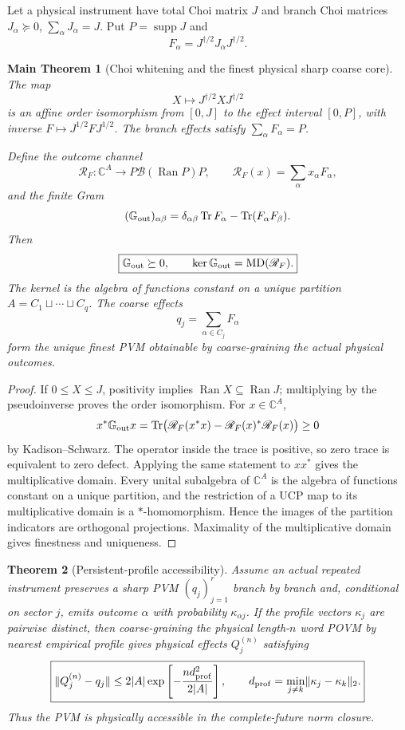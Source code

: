 \documentclass[11pt,oneside,openany]{book}
\numberwithin{equation}{chapter}
\newtheorem{theorem}{Theorem}[chapter]
\newtheorem{maintheorem}[theorem]{Main Theorem}
\theoremstyle{definition}
\theoremstyle{remark}
\newcommand{\C}{\mathbb C}
\newcommand{\Tr}{\operatorname{Tr}}
\newcommand{\supp}{\operatorname{supp}}
\newcommand{\Ran}{\operatorname{Ran}}
\newcommand{\norm}[1]{\lVert #1\rVert}
\begin{document}
Let a physical instrument have total Choi matrix \(J\) and branch Choi
matrices \(J_\alpha\succeq0\), \(\sum_\alpha J_\alpha=J\).  Put
\(P=\supp J\) and
\[
 F_\alpha=J^{\dagger/2}J_\alpha J^{\dagger/2}.
\]

\begin{maintheorem}[Choi whitening and the finest physical sharp coarse core]
\label{thm:v6-sharp-core}
The map
\[
 X\longmapsto J^{\dagger/2}XJ^{\dagger/2}
\]
is an affine order isomorphism from \([0,J]\) to the effect interval
\([0,P]\), with inverse \(F\mapsto J^{1/2}FJ^{1/2}\).  The branch effects
satisfy \(\sum_\alpha F_\alpha=P\).

Define the outcome channel
\[
 \mathscr R_F:\C^{A}\to P\mathcal B(\Ran P)P,
 \qquad
 \mathscr R_F(x)=\sum_\alpha x_\alpha F_\alpha,
\]
and the finite Gram
\[
 (\mathbb G_{\rm out})_{\alpha\beta}
 =\delta_{\alpha\beta}\Tr F_\alpha
 -\Tr(F_\alpha F_\beta).
\]
Then
\[
 \boxed{\mathbb G_{\rm out}\succeq0,
 \qquad \ker\mathbb G_{\rm out}=\operatorname{MD}(\mathscr R_F).}
\]
The kernel is the algebra of functions constant on a unique partition
\(A=C_1\sqcup\cdots\sqcup C_q\).  The coarse effects
\[
 \boxed{q_j=\sum_{\alpha\in C_j}F_\alpha}
\]
form the unique finest PVM obtainable by coarse-graining the actual physical
outcomes.
\end{maintheorem}

\begin{proof}
If \(0\le X\le J\), positivity implies \(\Ran X\subseteq\Ran J\); multiplying
by the pseudoinverse proves the order isomorphism.  For \(x\in\C^A\),
\[
 x^*\mathbb G_{\rm out}x
 =\Tr\bigl(\mathscr R_F(x^*x)
 -\mathscr R_F(x)^*\mathscr R_F(x)\bigr)\ge0
\]
by Kadison--Schwarz.  The operator inside the trace is positive, so zero trace
is equivalent to zero defect.  Applying the same statement to \(xx^*\) gives
the multiplicative domain.  Every unital subalgebra of \(\C^A\) is the
algebra of functions constant on a unique partition, and the restriction of a
UCP map to its multiplicative domain is a \(*\)-homomorphism.  Hence the images
of the partition indicators are orthogonal projections.  Maximality of the
multiplicative domain gives finestness and uniqueness.
\end{proof}

\begin{theorem}[Persistent-profile accessibility]
\label{thm:v6-profile-access}
Assume an actual repeated instrument preserves a sharp PVM
\((q_j)_{j=1}^r\) branch by branch and, conditional on sector \(j\), emits
outcome \(\alpha\) with probability \(\kappa_{\alpha j}\).  If the profile
vectors \(\kappa_j\) are pairwise distinct, then coarse-graining the physical
length-\(n\) word POVM by nearest empirical profile gives physical effects
\(Q_j^{(n)}\) satisfying
\[
 \boxed{
 \norm{Q_j^{(n)}-q_j}
 \le 2|A|\exp\left[-\frac{n d_{\rm prof}^2}{2|A|}\right],
 \qquad
 d_{\rm prof}=\min_{j\ne k}\norm{\kappa_j-\kappa_k}_2.}
\]
Thus the PVM is physically accessible in the complete-future norm closure.
\end{theorem}
\end{document}
